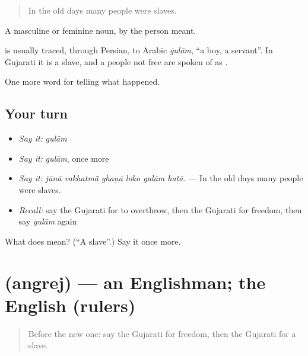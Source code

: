 \begin{quote}
In the old days many people were slaves.
\end{quote}

A masculine or feminine noun, by the person meant.

\begin{cousinweb}
is usually traced, through Persian, to Arabic \emph{ġulām}, \textquotedblleft{}a boy, a servant\textquotedblright{}. In Gujarati it is a slave, and a people not free are spoken of as \textbf{}.
\end{cousinweb}

\begin{grammarlens}[title={What you've built}]
One more word for telling what happened.
\end{grammarlens}

\subsection*{Your turn}
\begin{itemize}
\raggedright
  \item \emph{Say it:} \emph{gulām}
  \item \emph{Say it:} \emph{gulām}, once more
  \item \emph{Say it:} \emph{jūnā vakhatmā̃ ghaṇā loko gulām hatā.} — In the old days many people were slaves.
  \item \emph{Recall:} say the Gujarati for to overthrow, then the Gujarati for freedom, then say \emph{gulām} again
\end{itemize}

\begin{tcolorbox}[breakable,colback=teal!4,colframe=teal!35!black,title={Before you move on}]
What does  mean? (\textquotedblleft{}A slave\textquotedblright{}.) Say it once more.
\end{tcolorbox}
\section[\texorpdfstring{\gu{અંગ્રેજ} (angrej)}{અંગ્રેજ (angrej)}]{ (angrej) — an Englishman; the English (rulers)}

\label{lesson:GU-C325-angrej}



\begin{quote}
Before the new one: say the Gujarati for freedom, then the Gujarati for a slave.
\end{quote}

